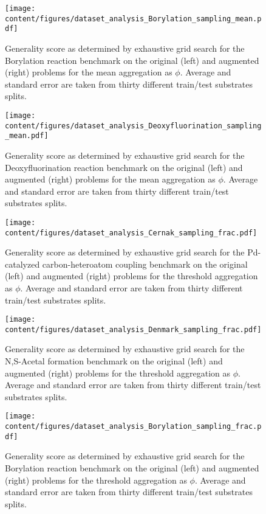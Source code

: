 \begin{figure}[t]
    \centering
    \texttt{[image: content/figures/dataset\_analysis\_Borylation\_sampling\_mean.pdf]}
    \caption{Generality score as determined by exhaustive grid search for the Borylation reaction benchmark on the original (left) and augmented (right) problems for the mean aggregation as $\phi$. Average and standard error are taken from thirty different train/test substrates splits.}
    \label{fig:results_dataset-analysis_Borylation_combined_mean}
\end{figure}

\begin{figure}[t]
    \centering
    \texttt{[image: content/figures/dataset\_analysis\_Deoxyfluorination\_sampling\_mean.pdf]}
    \caption{Generality score as determined by exhaustive grid search for the Deoxyfluorination reaction benchmark on the original (left) and augmented (right) problems for the mean aggregation as $\phi$. Average and standard error are taken from thirty different train/test substrates splits.}
    \label{fig:results_dataset-analysis_Deoxyfluorination_combined_mean}
\end{figure}

\begin{figure}[t]
    \centering
    \texttt{[image: content/figures/dataset\_analysis\_Cernak\_sampling\_frac.pdf]}
    \caption{Generality score as determined by exhaustive grid search for the Pd-catalyzed carbon-heteroatom coupling benchmark on the original (left) and augmented (right) problems for the threshold aggregation as $\phi$. Average and standard error are taken from thirty different train/test substrates splits.}
    \label{fig:results_dataset-analysis_Cernak_combined_frac}
\end{figure}

\begin{figure}[t]
    \centering
    \texttt{[image: content/figures/dataset\_analysis\_Denmark\_sampling\_frac.pdf]}
    \caption{Generality score as determined by exhaustive grid search for the N,S-Acetal formation benchmark on the original (left) and augmented (right) problems for the threshold aggregation as $\phi$. Average and standard error are taken from thirty different train/test substrates splits.}
    \label{fig:results_dataset-analysis_Denmark_combined_frac}
\end{figure}

\begin{figure}[t]
    \centering
    \texttt{[image: content/figures/dataset\_analysis\_Borylation\_sampling\_frac.pdf]}
    \caption{Generality score as determined by exhaustive grid search for the Borylation reaction benchmark on the original (left) and augmented (right) problems for the threshold aggregation as $\phi$. Average and standard error are taken from thirty different train/test substrates splits.}
    \label{fig:results_dataset-analysis_Borylation_combined_frac}
\end{figure}


